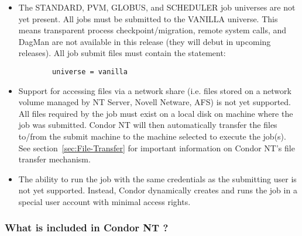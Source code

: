 \begin{itemize}

\item The STANDARD, PVM, GLOBUS, and SCHEDULER job universes are not yet
present.  
All jobs must be submitted to the VANILLA universe.  This means
transparent process checkpoint/migration, remote system calls, and DagMan
are not available in this release (they will debut in upcoming releases).
All job submit files must contain the statement:
\begin{verbatim}
        universe = vanilla
\end{verbatim}

\item Support for accessing files via a network share (i.e. files stored on
a network volume managed by NT Server, Novell Netware, AFS) is not yet
supported.  All files required by the job must exist on a local disk on
machine where the job was submitted.  Condor NT will then automatically
transfer the files to/from the submit machine to the machine selected to
execute the job(s).  See section~\ref{sec:File-Transfer} for important
information on Condor NT's file transfer mechanism.

\item The ability to run the job with the same credentials as the submitting
user is not yet supported.  Instead, Condor dynamically creates and runs the
job in a special user account with minimal access rights.

\end{itemize}

\subsubsection{What is included in Condor NT \VersionNotice?}

